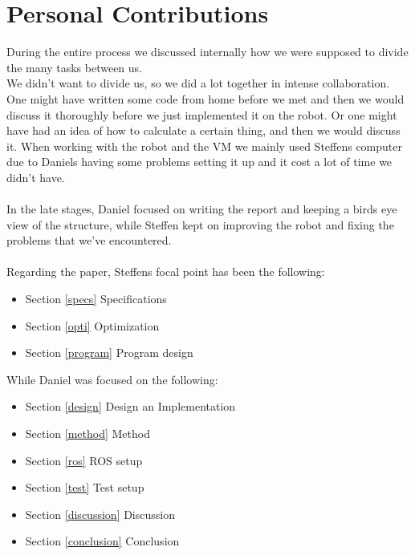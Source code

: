 \documentclass[conference]{IEEEtran}
\begin{document}
\section{Personal Contributions}
During the entire process we discussed internally how we were supposed to divide the many tasks between us.\\
We didn't want to divide us, so we did a lot together in intense collaboration. One might have written some 
code from home before we met and then we would discuss it thoroughly before we just implemented it on the robot. 
Or one might have had an idea of how to calculate a certain thing, and then we would discuss it. 
When working with the robot and the VM we mainly used Steffens computer due to Daniels having some problems 
setting it up and it cost a lot of time we didn't have. \\\\
In the late stages, Daniel focused on writing the report and keeping a birds eye view of the structure, 
while Steffen kept on improving the robot and fixing the problems that we've encountered.\\\\
Regarding the paper, Steffens focal point has been the following:
\begin{itemize}
\item Section \ref{specs} Specifications
\item Section \ref{opti} Optimization
\item Section \ref{program} Program design
\end{itemize}
While Daniel was focused on the following:
\begin{itemize}
\item Section \ref{design} Design an Implementation
\item Section \ref{method} Method
\item Section \ref{ros} ROS setup
\item Section \ref{test} Test setup
\item Section \ref{discussion} Discussion
\item Section \ref{conclusion} Conclusion
\end{itemize}
\end{document}
